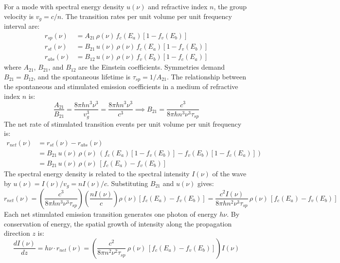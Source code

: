 For a mode with spectral energy density $u(\nu)$ and refractive index $n$, the group velocity is $v_g = c/n$. The transition rates per unit volume per unit frequency interval are:
\begin{align*}
    r_{sp}(\nu) &= A_{21}\,\rho(\nu)\,f_c(E_a)\!\left[1 - f_v(E_b)\right] \\
    r_{st}(\nu) &= B_{21}\,u(\nu)\,\rho(\nu)\,f_c(E_a)\!\left[1 - f_v(E_b)\right] \\
    r_{abs}(\nu) &= B_{12}\,u(\nu)\,\rho(\nu)\,f_v(E_b)\!\left[1 - f_c(E_a)\right]
\end{align*}
where $A_{21}$, $B_{21}$, and $B_{12}$ are the Einstein coefficients. Symmetries demand $B_{21} = B_{12}$, and the spontaneous lifetime is $\tau_{sp} = 1/A_{21}$. The relationship between the spontaneous and stimulated emission coefficients in a medium of refractive index $n$ is:
\begin{equation*}
    \frac{A_{21}}{B_{21}} = \frac{8\pi h n^3 \nu^3}{v_g^3} = \frac{8\pi h n^3 \nu^3}{c^3} \implies B_{21} = \frac{c^3}{8\pi h n^3 \nu^3 \tau_{sp}}
\end{equation*}
The net rate of stimulated transition events per unit volume per unit frequency is:
\begin{align*}
    r_{net}(\nu) &= r_{st}(\nu) - r_{abs}(\nu) \\
    &= B_{21}\,u(\nu)\,\rho(\nu)\,\left( f_c(E_a)\!\left[1 - f_v(E_b)\right] - f_v(E_b)\!\left[1 - f_c(E_a)\right] \right) \\
    &= B_{21}\,u(\nu)\,\rho(\nu)\,\left[f_c(E_a) - f_v(E_b)\right]
\end{align*}
The spectral energy density is related to the spectral intensity $I(\nu)$ of the wave by $u(\nu) = I(\nu)/v_g = n I(\nu)/c$. Substituting $B_{21}$ and $u(\nu)$ gives:
\begin{equation*}
    r_{net}(\nu) = \left(\frac{c^3}{8\pi h n^3 \nu^3 \tau_{sp}}\right) \left(\frac{n I(\nu)}{c}\right) \rho(\nu) \left[f_c(E_a) - f_v(E_b)\right] = \frac{c^2 I(\nu)}{8\pi h n^2 \nu^3 \tau_{sp}}\,\rho(\nu)\,\left[f_c(E_a) - f_v(E_b)\right]
\end{equation*}
Each net stimulated emission transition generates one photon of energy $h\nu$. By conservation of energy, the spatial growth of intensity along the propagation direction $z$ is:
\begin{equation*}
    \frac{dI(\nu)}{dz} = h\nu \cdot r_{net}(\nu) = \left(\frac{c^2}{8\pi n^2 \nu^2 \tau_{sp}}\,\rho(\nu)\,\left[f_c(E_a) - f_v(E_b)\right]\right) I(\nu)
\end{equation*}
